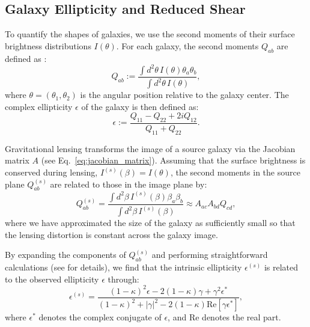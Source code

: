 \subsection{Galaxy Ellipticity and Reduced Shear}
To quantify the shapes of galaxies, we use the second moments of their surface brightness distributions $I(\theta)$. For each galaxy, the second moments $Q_{ab}$ are defined as \citep{2001PhR...340..291B}:
\begin{equation}
    Q_{ab} := \frac{\int d^2\theta\, I(\theta) \theta_a \theta_b}{\int d^2\theta\, I(\theta)},
    \label{eq:second_moments}
\end{equation}
where $\theta = (\theta_1, \theta_2)$ is the angular position relative to the galaxy center. The complex ellipticity $\epsilon$ of the galaxy is then defined as:
\begin{equation}
    \epsilon := \frac{Q_{11} - Q_{22} + 2i Q_{12}}{Q_{11} + Q_{22}}.
    \label{eq:complex_ellipticity}
\end{equation}

Gravitational lensing transforms the image of a source galaxy via the Jacobian matrix $A$ (see Eq.~\eqref{eq:jacobian_matrix}). Assuming that the surface brightness is conserved during lensing, $I^{(s)}(\beta) = I(\theta)$, the second moments in the source plane $Q_{ab}^{(s)}$ are related to those in the image plane by:
\begin{equation}
    Q_{ab}^{(s)} = \frac{\int d^2\beta\, I^{(s)}(\beta) \beta_a \beta_b}{\int d^2\beta\, I^{(s)}(\beta)} \approx A_{ac} A_{bd} Q_{cd},
    \label{eq:second_moments_source}
\end{equation}
where we have approximated the size of the galaxy as sufficiently small so that the lensing distortion is constant across the galaxy image.

By expanding the components of $Q_{ab}^{(s)}$ and performing straightforward calculations (see \citealt{1992grle.book.....S} for details), we find that the intrinsic ellipticity $\epsilon^{(s)}$ is related to the observed ellipticity $\epsilon$ through:
\begin{equation}
    \epsilon^{(s)} = \frac{(1 - \kappa)^2 \epsilon - 2 (1 - \kappa) \gamma + \gamma^2 \epsilon^*}{(1 - \kappa)^2 + |\gamma|^2 - 2 (1 - \kappa) \text{Re}[\gamma \epsilon^*]},
    \label{eq:reduced_shear_ellipticity}
\end{equation}
where $\epsilon^*$ denotes the complex conjugate of $\epsilon$, and $\text{Re}$ denotes the real part.

